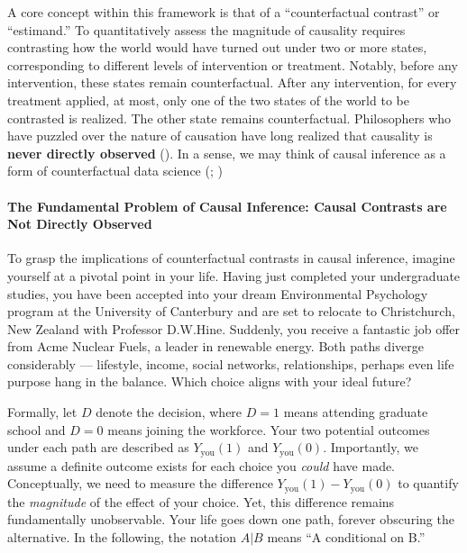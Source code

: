 \documentclass[
  singlecolumn]{article}
\let\oldparagraph\paragraph
\renewcommand{\paragraph}[1]{\oldparagraph{#1}\mbox{}}
\begin{document}
A core concept within this framework is that of a ``counterfactual
contrast'' or ``estimand.'' To quantitatively assess the magnitude of
causality requires contrasting how the world would have turned out under
two or more states, corresponding to different levels of intervention or
treatment. Notably, before any intervention, these states remain
counterfactual. After any intervention, for every treatment applied, at
most, only one of the two states of the world to be contrasted is
realized. The other state remains counterfactual. Philosophers who have
puzzled over the nature of causation have long realized that causality
is \textbf{never directly observed} (). In a sense, we may think of causal inference as a form of
counterfactual data science (; )

\paragraph{The Fundamental Problem of Causal Inference: Causal Contrasts
are Not Directly
Observed}\label{the-fundamental-problem-of-causal-inference-causal-contrasts-are-not-directly-observed}

To grasp the implications of counterfactual contrasts in causal
inference, imagine yourself at a pivotal point in your life. Having just
completed your undergraduate studies, you have been accepted into your
dream Environmental Psychology program at the University of Canterbury
and are set to relocate to Christchurch, New Zealand with Professor
D.W.Hine. Suddenly, you receive a fantastic job offer from Acme Nuclear
Fuels, a leader in renewable energy. Both paths diverge considerably ---
lifestyle, income, social networks, relationships, perhaps even life
purpose hang in the balance. Which choice aligns with your ideal future?

Formally, let \(D\) denote the decision, where \(D = 1\) means attending
graduate school and \(D = 0\) means joining the workforce. Your two
potential outcomes under each path are described as
\(Y_{\text{you}}(1)\) and \(Y_{\text{you}}(0)\). Importantly, we assume
a definite outcome exists for each choice you \emph{could} have made.
Conceptually, we need to measure the difference
\(Y_{\text{you}}(1) - Y_{\text{you}}(0)\) to quantify the
\emph{magnitude} of the effect of your choice. Yet, this difference
remains fundamentally unobservable. Your life goes down one path,
forever obscuring the alternative. In the following, the notation
\(A|B\) means ``A conditional on B.''
\end{document}
